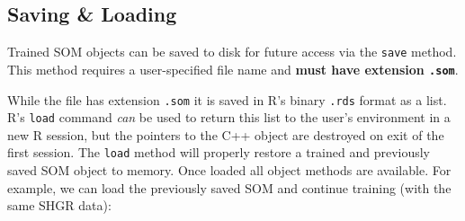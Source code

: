 \documentclass[]{article}
\newenvironment{Shaded}{\begin{snugshade}}{\end{snugshade}}
\newcommand{\CommentTok}[1]{\textcolor[rgb]{0.56,0.35,0.01}{\textit{#1}}}
\newcommand{\KeywordTok}[1]{\textcolor[rgb]{0.13,0.29,0.53}{\textbf{#1}}}
\newcommand{\NormalTok}[1]{#1}
\newcommand{\OperatorTok}[1]{\textcolor[rgb]{0.81,0.36,0.00}{\textbf{#1}}}
\newcommand{\StringTok}[1]{\textcolor[rgb]{0.31,0.60,0.02}{#1}}
\begin{document}
\hypertarget{saving-loading}{%
\subsection{Saving \& Loading}\label{saving-loading}}

Trained SOM objects can be saved to disk for future access via the \texttt{save} method. This method requires a user-specified file name and \textbf{must have extension \texttt{.som}}.

\begin{Shaded}
\end{Shaded}

While the file has extension \texttt{.som} it is saved in R's binary \texttt{.rds} format as a list. R's \texttt{load} command \emph{can} be used to return this list to the user's environment in a new R session, but the pointers to the C++ object are destroyed on exit of the first session. The \texttt{load} method will properly restore a trained and previously saved SOM object to memory. Once loaded all object methods are available. For example, we can load the previously saved SOM and continue training (with the same SHGR data):
\end{document}
